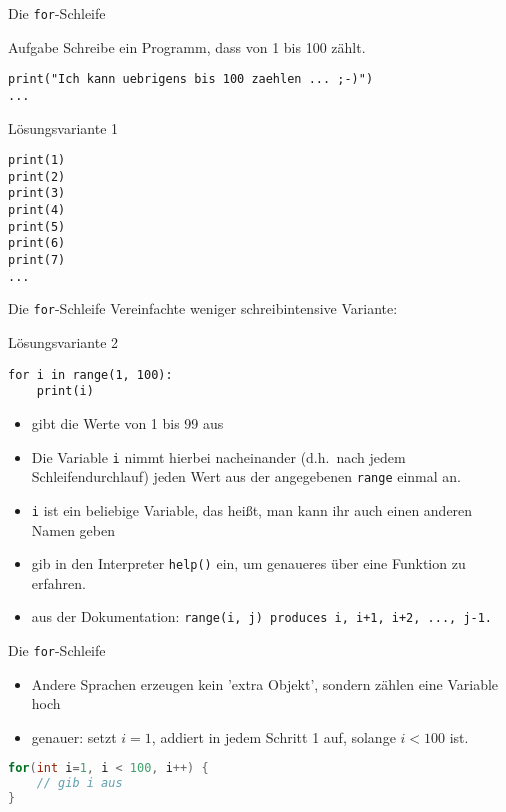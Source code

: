 \begin{frame}[fragile]{Die \texttt{for}-Schleife}
\begin{block}{Aufgabe}
    Schreibe ein Programm, dass von 1 bis 100 zählt.
    \begin{lstlisting}
print("Ich kann uebrigens bis 100 zaehlen ... ;-)")
...
    \end{lstlisting}
\end{block}
\pause{}
\begin{exampleblock}{Lösungsvariante 1}
    \begin{lstlisting}
print(1)
print(2)
print(3)
print(4)
print(5)
print(6)
print(7)
...
    \end{lstlisting}
\end{exampleblock}
\end{frame}

\begin{frame}[fragile]{Die \texttt{for}-Schleife}
Vereinfachte weniger schreibintensive Variante:
\begin{exampleblock}{Lösungsvariante 2}
    \begin{lstlisting}
for i in range(1, 100):
    print(i)
    \end{lstlisting}
\end{exampleblock}
\begin{itemize}
    \item gibt die Werte von 1 bis 99 aus
    \item Die Variable \texttt{i} nimmt hierbei nacheinander (d.h.\ nach jedem Schleifendurchlauf) jeden Wert 
        aus der angegebenen \texttt{range} einmal an.
    \item \texttt{i} ist ein beliebige Variable, das heißt, man kann ihr auch einen anderen Namen geben
    \pause{} 
    \item gib in den Interpreter \texttt{help()} ein, um genaueres über 
    eine Funktion zu erfahren. 
    \pause{}
    \item aus der Dokumentation: \texttt{range(i, j) produces i, i+1, i+2, ..., j-1.}
\end{itemize}
\end{frame}

\begin{frame}[fragile]{Die \texttt{for}-Schleife}
\begin{itemize}
    \item Andere Sprachen erzeugen kein 'extra Objekt', sondern zählen eine 
    Variable hoch
    \item genauer: setzt $i=1$, addiert in jedem Schritt 1 auf, 
    solange $i < 100$ ist. 
\end{itemize}
\begin{lstlisting}[language=Java]
for(int i=1, i < 100, i++) {
    // gib i aus
}
\end{lstlisting}
\end{frame}

